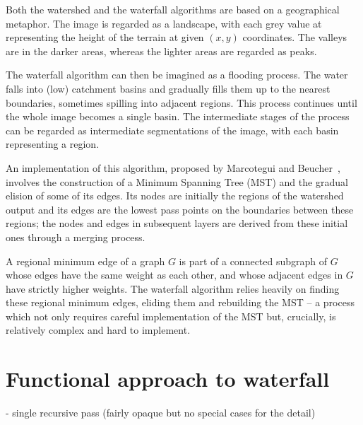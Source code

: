 \documentclass{jfp}
\begin{document}
Both the watershed and the waterfall algorithms are based on a
geographical metaphor. The image is regarded as a landscape, with each
grey value at representing the height of the terrain at given $(x,y)$
coordinates.
%
The valleys are
in the darker areas, whereas the lighter areas are regarded as peaks.

The waterfall algorithm can then be imagined
as a flooding process. The water falls into (low) catchment basins and
gradually fills them up to the nearest boundaries, sometimes spilling
into adjacent regions. This process continues until the whole image
becomes a single basin. The intermediate stages of the process can be
regarded as intermediate segmentations of the image, with each basin
representing a region.

An implementation of this algorithm, proposed by Marcotegui and
Beucher~\cite{marcotegui}, involves the construction of a Minimum
Spanning Tree (MST) and the gradual elision of some of its edges.  Its
nodes are initially the regions of the watershed output and its edges
are the lowest pass points on the boundaries between these regions;
the nodes and edges in subsequent layers are derived from these
initial ones through a merging process.

A regional minimum edge of a graph $G$ is part of a connected subgraph
of $G$ whose edges have the same weight as each other, and whose
adjacent edges in $G$ have strictly higher weights. The waterfall
algorithm relies heavily on finding these regional minimum edges,
eliding them and rebuilding the MST -- a process which not only
requires careful implementation of the MST but, crucially, is
relatively complex and hard to implement.

\iffalse
The collection of regional minimum edges of a graph $G$ is a connected
subgraph of $G$ whose edges have the same weight as each other, and
whose adjacent edges in $G$ have strictly higher weights. The
waterfall algorithm relies heavily on finding these regional minimum
edges, eliding them and rebuilding the MST -- a process which not only
requires careful implementation of the MST but, more importantly, is
relatively complex and hard to implement.
\fi


\section{Functional approach to waterfall}

 - single recursive pass (fairly opaque but no special cases for the
 detail)
\end{document}
